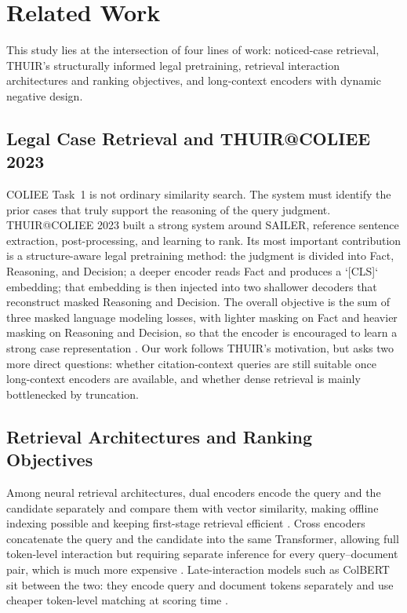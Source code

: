 \section{Related Work}

This study lies at the intersection of four lines of work: noticed-case retrieval, THUIR's structurally informed legal pretraining, retrieval interaction architectures and ranking objectives, and long-context encoders with dynamic negative design.

\subsection{Legal Case Retrieval and THUIR@COLIEE 2023}

COLIEE Task~1 is not ordinary similarity search. The system must identify the prior cases that truly support the reasoning of the query judgment. THUIR@COLIEE 2023 \cite{li2023thuir} built a strong system around SAILER, reference sentence extraction, post-processing, and learning to rank. Its most important contribution is a structure-aware legal pretraining method: the judgment is divided into Fact, Reasoning, and Decision; a deeper encoder reads Fact and produces a `[CLS]` embedding; that embedding is then injected into two shallower decoders that reconstruct masked Reasoning and Decision. The overall objective is the sum of three masked language modeling losses, with lighter masking on Fact and heavier masking on Reasoning and Decision, so that the encoder is encouraged to learn a strong case representation \cite{li2023thuir}. Our work follows THUIR's motivation, but asks two more direct questions: whether citation-context queries are still suitable once long-context encoders are available, and whether dense retrieval is mainly bottlenecked by truncation.

\subsection{Retrieval Architectures and Ranking Objectives}

Among neural retrieval architectures, dual encoders encode the query and the candidate separately and compare them with vector similarity, making offline indexing possible and keeping first-stage retrieval efficient \cite{karpukhin2020dpr}. Cross encoders concatenate the query and the candidate into the same Transformer, allowing full token-level interaction but requiring separate inference for every query--document pair, which is much more expensive \cite{nogueira2019bertpr}. Late-interaction models such as ColBERT sit between the two: they encode query and document tokens separately and use cheaper token-level matching at scoring time \cite{khattab2020colbert}.

